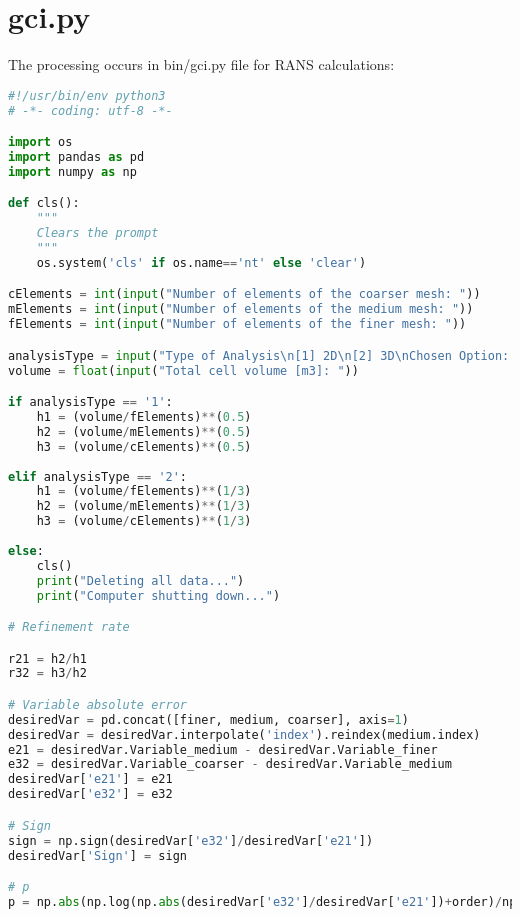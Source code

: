 \section{gci.py}
The processing occurs in bin/gci.py file for RANS calculations:

\begin{lstlisting}[language=python]
#!/usr/bin/env python3
# -*- coding: utf-8 -*-

import os
import pandas as pd
import numpy as np

def cls():
    """
    Clears the prompt
    """
    os.system('cls' if os.name=='nt' else 'clear')

cElements = int(input("Number of elements of the coarser mesh: "))
mElements = int(input("Number of elements of the medium mesh: "))
fElements = int(input("Number of elements of the finer mesh: "))

analysisType = input("Type of Analysis\n[1] 2D\n[2] 3D\nChosen Option: ")
volume = float(input("Total cell volume [m3]: "))

if analysisType == '1':
	h1 = (volume/fElements)**(0.5)
	h2 = (volume/mElements)**(0.5)
	h3 = (volume/cElements)**(0.5)
	
elif analysisType == '2':
	h1 = (volume/fElements)**(1/3)
	h2 = (volume/mElements)**(1/3)
	h3 = (volume/cElements)**(1/3)
	
else:
	cls()
	print("Deleting all data...")
	print("Computer shutting down...")

# Refinement rate

r21 = h2/h1
r32 = h3/h2

# Variable absolute error
desiredVar = pd.concat([finer, medium, coarser], axis=1)
desiredVar = desiredVar.interpolate('index').reindex(medium.index)
e21 = desiredVar.Variable_medium - desiredVar.Variable_finer
e32 = desiredVar.Variable_coarser - desiredVar.Variable_medium
desiredVar['e21'] = e21
desiredVar['e32'] = e32

# Sign
sign = np.sign(desiredVar['e32']/desiredVar['e21'])
desiredVar['Sign'] = sign

# p 
p = np.abs(np.log(np.abs(desiredVar['e32']/desiredVar['e21'])+order)/np.log(r21))

\end{lstlisting}

